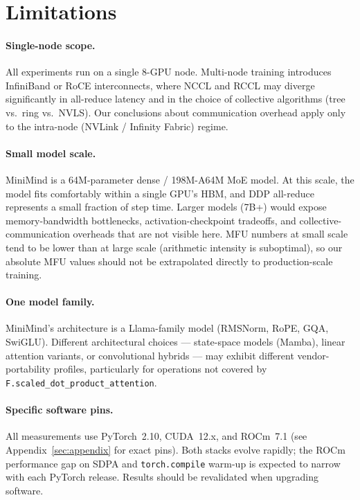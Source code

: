 \section{Limitations}
\label{sec:limitations}

\paragraph{Single-node scope.}
All experiments run on a single 8-GPU node.  Multi-node training introduces
InfiniBand or RoCE interconnects, where NCCL and RCCL may diverge significantly
in all-reduce latency and in the choice of collective algorithms (tree vs.\
ring vs.\ NVLS).  Our conclusions about communication overhead apply only to
the intra-node (NVLink / Infinity Fabric) regime.

\paragraph{Small model scale.}
MiniMind is a 64M-parameter dense / 198M-A64M MoE model.  At this scale,
the model fits comfortably within a single GPU's HBM, and DDP all-reduce
represents a small fraction of step time.  Larger models (7B+) would expose
memory-bandwidth bottlenecks, activation-checkpoint tradeoffs, and
collective-communication overheads that are not visible here.  MFU numbers
at small scale tend to be lower than at large scale (arithmetic intensity is
suboptimal), so our absolute MFU values should not be extrapolated directly
to production-scale training.

\paragraph{One model family.}
MiniMind's architecture is a Llama-family model (RMSNorm, RoPE, GQA, SwiGLU).
Different architectural choices — state-space models (Mamba), linear attention
variants, or convolutional hybrids — may exhibit different vendor-portability
profiles, particularly for operations not covered by \texttt{F.scaled\_dot\_product\_attention}.

\paragraph{Specific software pins.}
All measurements use PyTorch~2.10, CUDA~12.x, and ROCm~7.1 (see
Appendix~\ref{sec:appendix} for exact pins).  Both stacks evolve rapidly;
the ROCm performance gap on SDPA and \texttt{torch.compile} warm-up is
expected to narrow with each PyTorch release.  Results should be revalidated
when upgrading software.

